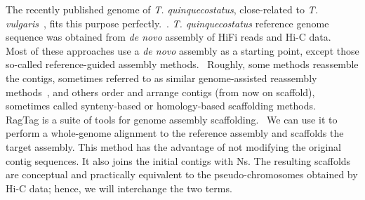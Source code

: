 The recently published genome of \textit{T. quinquecostatus}, close-related to \textit{T. vulgaris}~\cite{sunPopulationDiversityAnalyses2023},  fits this purpose perfectly.~\cite{sunChromosomelevelAssemblyAnalysis2022}. \textit{T. quinquecostatus} reference genome sequence was obtained from \textit{de novo} assembly of  \ac{HiFi} reads and \ac{Hi-C} data.\\ 

Most of these approaches use a \textit{de novo} assembly as a starting point, except those so-called reference-guided assembly methods.~\cite{ReferenceguidedAssemblyFour,lischerReferenceguidedNovoAssembly2017} Roughly, some methods reassemble the contigs, sometimes referred to as similar genome-assisted reassembly methods~\cite{baoAlignGraphAlgorithmSecondary2014,huangAlignGraph2SimilarGenomeassisted2021,baoReMILOReferenceAssisted2018}, and others order and arrange contigs (from now on scaffold), sometimes called synteny-based or homology-based scaffolding methods.~\cite{kimReferenceassistedChromosomeAssembly2013,FenderglassRagoutChromosomelevel,alongeAutomatedAssemblyScaffolding2022}\\

RagTag is a suite of tools for genome assembly scaffolding.~\cite{FenderglassRagoutChromosomelevel} We can use it to perform a whole-genome alignment to the reference assembly and scaffolds the target assembly. This method has the advantage of not modifying the original contig sequences. It also joins the initial contigs with Ns. The resulting scaffolds are conceptual and practically equivalent to the pseudo-chromosomes obtained by \ac{Hi-C} data; hence, we will interchange the two terms. 